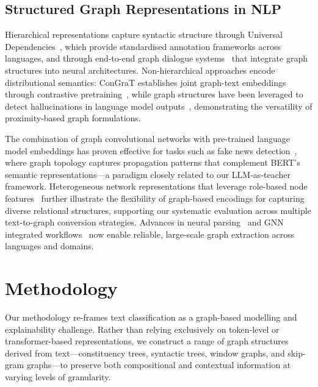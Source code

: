 \documentclass[preprint, times, review, 10pt]{elsarticle}
\begin{document}
\subsection{Structured Graph Representations in NLP} \label{text_trees}

Hierarchical representations capture syntactic structure through Universal Dependencies~\cite{de-marneffe-etal-2021-universal}, which provide standardised annotation frameworks across languages, and through end-to-end graph dialogue systems~\cite{yang-etal-2020-graphdialog} that integrate graph structures into neural architectures. Non-hierarchical approaches encode distributional semantics: ConGraT establishes joint graph-text embeddings through contrastive pretraining~\cite{brannon-etal-2024-congrat}, while graph structures have been leveraged to detect hallucinations in language model outputs~\cite{nonkes-etal-2024-leveraging}, demonstrating the versatility of proximity-based graph formulations.

The combination of graph convolutional networks with pre-trained language model embeddings has proven effective for tasks such as fake news detection~\cite{zhang2024gbca}, where graph topology captures propagation patterns that complement BERT's semantic representations—a paradigm closely related to our LLM-as-teacher framework. Heterogeneous network representations that leverage role-based node 
features~\cite{sun2023heterogeneous} further illustrate the flexibility of graph-based encodings for capturing diverse relational structures, supporting our systematic evaluation across multiple text-to-graph conversion strategies. Advances in neural parsing~\cite{bauer-manning-2025-high} and GNN integrated workflows~\cite{yang2020stronglyincrementalconstituencyparsing} now enable reliable, large-scale graph extraction across languages and domains.


\section{Methodology} \label{methodology}

Our methodology re-frames text classification as a graph-based modelling and explainability challenge. Rather than relying exclusively on token-level or transformer-based representations, we construct a range of graph structures derived from text—constituency trees, syntactic trees, window graphs, and skip-gram graphs—to preserve both compositional and contextual information at varying levels of granularity.
\end{document}
